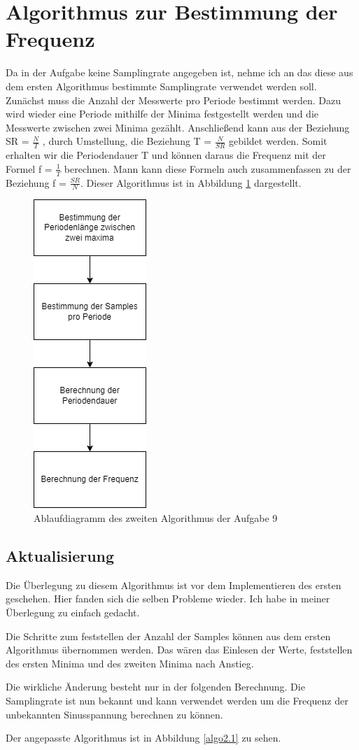 \section{Algorithmus zur Bestimmung der Frequenz}
Da in der Aufgabe keine Samplingrate angegeben ist, nehme ich an das diese aus dem ersten Algorithmus bestimmte Samplingrate verwendet werden soll.
Zunächst muss die Anzahl der Messwerte pro Periode bestimmt werden. 
Dazu wird wieder eine Periode mithilfe der Minima festgestellt werden und die Messwerte zwischen zwei Minima gezählt. 
Anschließend kann aus der Beziehung SR = $\frac{N}{T}$ , durch Umstellung, die Beziehung T = $\frac{N}{SR}$ gebildet werden. 
Somit erhalten wir die Periodendauer T und können daraus die Frequenz mit der Formel f = $\frac {1}{T}$ berechnen.
Mann kann diese Formeln auch zusammenfassen zu der Beziehung f = $\frac{SR}{N}.$
Dieser Algorithmus ist in Abbildung \ref{algo2} dargestellt.\par

\begin{figure}[h]
	\centering
	\includegraphics[scale=0.5]{Images/aufgabe9_algo2.png}
	\caption{Ablaufdiagramm des zweiten Algorithmus der Aufgabe 9}
	\label{algo2}
\end{figure}

\subsection{Aktualisierung}
Die Überlegung zu diesem Algorithmus ist vor dem Implementieren des ersten geschehen.
Hier fanden sich die selben Probleme wieder.
Ich habe in meiner Überlegung zu einfach gedacht.\par
Die Schritte zum feststellen der Anzahl der Samples können aus dem ersten Algorithmus übernommen werden.
Das wären das Einlesen der Werte, feststellen des ersten Minima und des zweiten Minima nach Anstieg.\par
Die wirkliche Änderung besteht nur in der folgenden Berechnung.
Die Samplingrate ist nun bekannt und kann verwendet werden um die Frequenz der unbekannten Sinusspannung berechnen zu können.\par
Der angepasste Algorithmus ist in Abbildung \ref{algo2.1} zu sehen.

